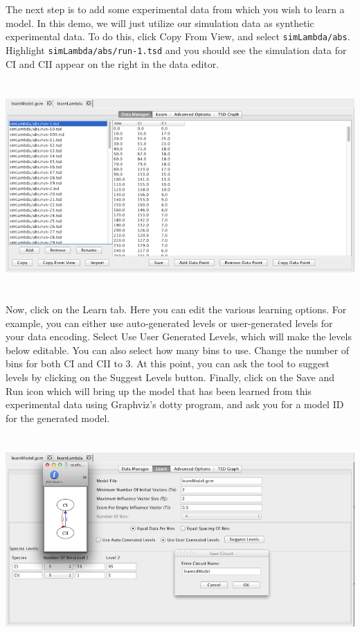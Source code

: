 \documentclass[titlepage,11pt]{article}
\begin{document}
The next step is to add some experimental data from which you wish to learn a model.  In this demo, we will just utilize our simulation data as synthetic experimental data.  To do this, click Copy From View, and select {\tt simLambda/abs}.  Highlight {\tt simLambda/abs/run-1.tsd} and you should see the simulation data for CI and CII appear on the right in the data editor. 

\begin{center}
\includegraphics[height=80mm]{screenshots/dataManager}
\end{center}

Now, click on the Learn tab.  Here you can edit the various learning options.  For example, you can either use auto-generated levels or user-generated levels for your data encoding.  Select Use User Generated Levels, which will make the levels below editable.  You can also select how many bins to use.  Change the number of bins for both CI and CII to 3.  At this point, you can ask the tool to suggest levels by clicking on the Suggest Levels button.  Finally, click on the Save and Run icon which will bring up the model that has been learned from this experimental data using Graphviz's dotty program, and ask you for a model ID for the generated model.  

\begin{center}
\includegraphics[height=80mm]{screenshots/learn}
\end{center}
\end{document}
